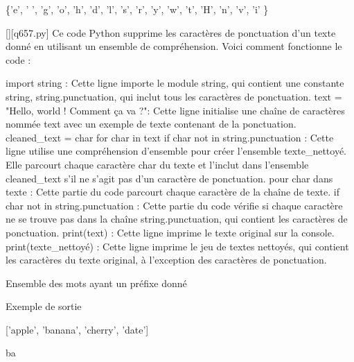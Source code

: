 \{'e', ' ', 'g', 'o', 'h', 'd', 'l', 's', 'r', 'y', 'w', 't', 'H', 'n', 'v', 'i' \}
        \par
        \begin{solution}
            \renewcommand{\nomfichier}{q657.py}
            \pythonfile{\chemincode \nomfichier}[][\nomfichier]
            Ce code Python supprime les caractères de ponctuation d'un texte donné en utilisant un ensemble de compréhension. Voici comment fonctionne le code :

    import string : Cette ligne importe le module string, qui contient une constante string, string.punctuation, qui inclut tous les caractères de ponctuation.
    text = "Hello, world ! Comment ça va ?": Cette ligne initialise une chaîne de caractères nommée text avec un exemple de texte contenant de la ponctuation.
    cleaned_text = {char for char in text if char not in string.punctuation} : Cette ligne utilise une compréhension d'ensemble pour créer l'ensemble texte_nettoyé. Elle parcourt chaque caractère char du texte et l'inclut dans l'ensemble cleaned_text s'il ne s'agit pas d'un caractère de ponctuation.
        pour char dans texte : Cette partie du code parcourt chaque caractère de la chaîne de texte.
        if char not in string.punctuation : Cette partie du code vérifie si chaque caractère ne se trouve pas dans la chaîne string.punctuation, qui contient les caractères de ponctuation.
    print(text) : Cette ligne imprime le texte original sur la console.
    print(texte_nettoyé) : Cette ligne imprime le jeu de textes nettoyés, qui contient les caractères du texte original, à l'exception des caractères de ponctuation.
        \end{solution}
        

        \question
        Ensemble des mots ayant un préfixe donné

Exemple de sortie

['apple', 'banana', 'cherry', 'date']

ba

